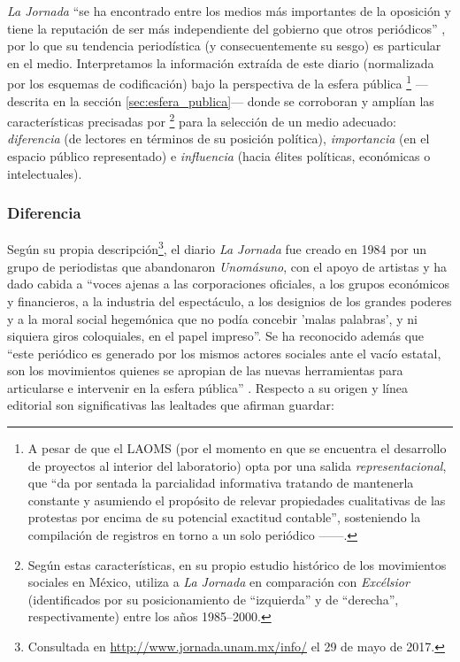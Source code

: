 \documentclass[letterpaper, 11pt]{book}
\theoremstyle{definition}
\theoremstyle{remark}
\begin{document}
\emph{La Jornada} ``se ha encontrado entre los medios más importantes de la oposición y tiene la reputación de ser más independiente del gobierno que otros periódicos'' \citep[119]{2003_Wada_Tesis}, por lo que su tendencia periodística (y consecuentemente su sesgo) es particular en el medio. Interpretamos la información extraída de este diario (normalizada por los esquemas de codificación) bajo la perspectiva de la esfera pública
\footnote{A pesar de que el LAOMS (por el momento en que se encuentra el desarrollo de proyectos al interior del laboratorio) opta por una salida \emph{representacional}, que ``da por sentada la parcialidad informativa tratando de mantenerla constante y asumiendo el propósito de relevar propiedades cualitativas de las protestas por encima de su potencial exactitud contable'', sosteniendo la compilación de registros en torno a un solo periódico ---\citep[3]{2017_Urbina_estudiantes}---.} 
---descrita en la sección \ref{sec:esfera_publica}--- donde se corroboran y amplían las características precisadas por \citet{2003_Wada_Tesis}\footnote{Según estas características, en su propio estudio histórico de los movimientos sociales en México, \citet{2003_Wada_Tesis} utiliza a \emph{La Jornada} en comparación con \emph{Excélsior} (identificados por su posicionamiento de ``izquierda'' y de ``derecha'', respectivamente) entre los años 1985--2000.} para la selección de un medio adecuado: \emph{diferencia} (de lectores en términos de su posición política), \emph{importancia} (en el espacio público representado) e \emph{influencia} (hacia élites políticas, económicas o intelectuales).






\subsubsection{Diferencia}
\label{sec:LaJornadaDiario_Diferencia}


Según su propia descripción\footnote{Consultada en \url{http://www.jornada.unam.mx/info/} el 29 de mayo de 2017.}, el diario \emph{La Jornada} fue creado en 1984 por un grupo de periodistas que abandonaron \emph{Unomásuno}, con el apoyo de artistas y ha dado cabida a ``voces ajenas a las corporaciones oficiales, a los grupos económicos y financieros, a la industria del espectáculo, a los designios de los grandes poderes y a la moral social hegemónica que no podía concebir 'malas palabras', y ni siquiera giros coloquiales, en el papel impreso''. 
Se ha reconocido además que ``este periódico es generado por los mismos actores sociales ante el vacío estatal, son los movimientos quienes se apropian de las nuevas herramientas para articularse e intervenir en la esfera pública'' \citep[21]{2011_Tesis_LaJornada}. Respecto a su origen y línea editorial son significativas las lealtades que afirman guardar:
\end{document}
